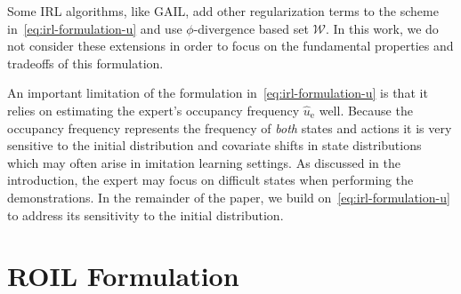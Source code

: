 \documentclass[10pt]{article}
\theoremstyle{plain}
\theoremstyle{remark}
\begin{document}
Some IRL algorithms, like GAIL, add other regularization terms to the scheme in~\eqref{eq:irl-formulation-u} and use $\phi$-divergence based set $\mathcal{W}$. In this work, we do not consider these extensions in order to focus on the fundamental properties and tradeoffs of this formulation.

An important limitation of the formulation in~\eqref{eq:irl-formulation-u} is that it relies on estimating the expert's occupancy frequency $\hat{u}_{\mathrm{e}}$ well. Because the occupancy frequency represents the frequency of \emph{both} states and actions it is very sensitive to the initial distribution and covariate shifts in state distributions which may often arise in imitation learning settings. As discussed in the introduction, the expert may focus on difficult states when performing the demonstrations. In the remainder of the paper, we build on~\eqref{eq:irl-formulation-u} to address its sensitivity to the initial distribution. 






\section{ROIL Formulation}\label{sec:optimization-formulation}
\end{document}
